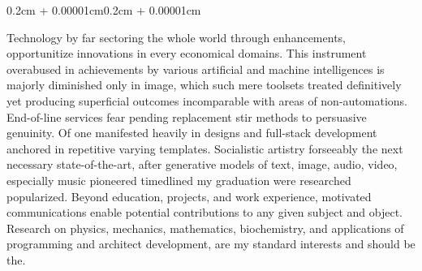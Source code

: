 \documentclass[10pt, letterpaper]{article}
\newenvironment{onecolentry}{
    \begin{adjustwidth}{0.2cm + 0.00001cm}{0.2cm + 0.00001cm}
}{
    \end{adjustwidth}
}
\newenvironment{firstprojectentry}{
    \needspace{2\baselineskip}
}{
}
\begin{document}
\begin{firstprojectentry}
\begin{onecolentry}


            Technology by far sectoring the whole world through enhancements, opportunitize innovations in every economical domains.
            This instrument overabused in achievements by various artificial and machine intelligences is majorly diminished only in image,
            which such mere toolsets treated definitively yet producing superficial outcomes incomparable with areas of non-automations.
            End-of-line services fear pending replacement stir methods to persuasive genuinity. Of one manifested heavily in designs and full-stack development anchored in repetitive varying templates.
            Socialistic artistry forseeably the next necessary state-of-the-art, after generative models of text, image, audio, video, especially music pioneered timedlined my graduation were researched popularized.
            Beyond education, projects, and work experience, motivated communications enable potential contributions to any given subject and object.
            Research on physics, mechanics, mathematics, biochemistry, and applications of programming and architect development, are my standard interests and should be the.
        \end{onecolentry}
    \end{firstprojectentry}
\end{document}
